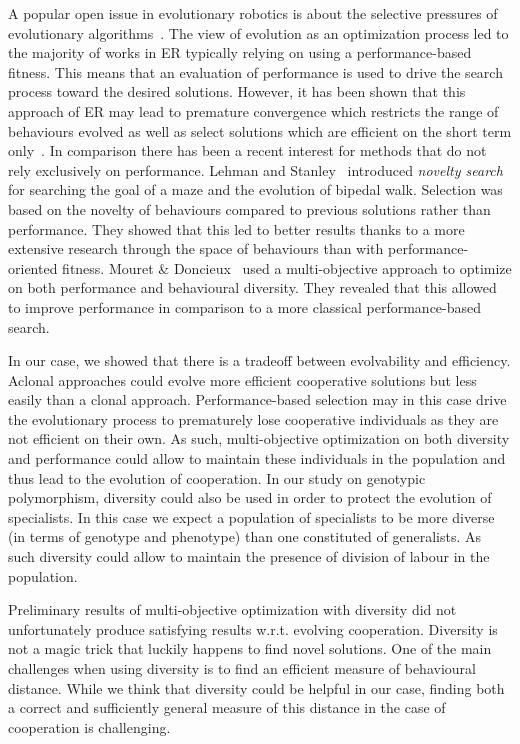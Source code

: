			A popular open issue in evolutionary robotics is about the selective pressures of evolutionary algorithms~\parencite{Doncieux2015a}. The view of evolution as an optimization process led to the majority of works in ER typically relying on using a performance-based fitness. This means that an evaluation of performance is used to drive the search process toward the desired solutions. However, it has been shown that this approach of ER may lead to premature convergence which restricts the range of behaviours evolved as well as select solutions which are efficient on the short term only~\parencite{Mouret2012a}. In comparison there has been a recent interest for methods that do not rely exclusively on performance. Lehman and Stanley~\parencite{Lehman2011} introduced \emph{novelty search} for searching the goal of a maze and the evolution of bipedal walk. Selection was based on the novelty of behaviours compared to previous solutions rather than performance. They showed that this led to better results thanks to a more extensive research through the space of behaviours than with performance-oriented fitness. Mouret \& Doncieux~\parencite{Mouret2012a} used a multi-objective approach to optimize on both performance and behavioural diversity. They revealed that this allowed to improve performance in comparison to a more classical performance-based search.

			In our case, we showed that there is a tradeoff between evolvability and efficiency. Aclonal approaches could evolve more efficient cooperative solutions but less easily than a clonal approach. Performance-based selection may in this case drive the evolutionary process to prematurely lose cooperative individuals as they are not efficient on their own. As such, multi-objective optimization on both diversity and performance could allow to maintain these individuals in the population and thus lead to the evolution of cooperation. In our study on genotypic polymorphism, diversity could also be used in order to protect the evolution of specialists. In this case we expect a population of specialists to be more diverse (in terms of genotype and phenotype) than one constituted of generalists. As such diversity could allow to maintain the presence of division of labour in the population.

			Preliminary results of multi-objective optimization with diversity did not unfortunately produce satisfying results w.r.t. evolving cooperation. Diversity is not a magic trick that luckily happens to find novel solutions. One of the main challenges when using diversity is to find an efficient measure of behavioural distance. While we think that diversity could be helpful in our case, finding both a correct and sufficiently general measure of this distance in the case of cooperation is challenging.



